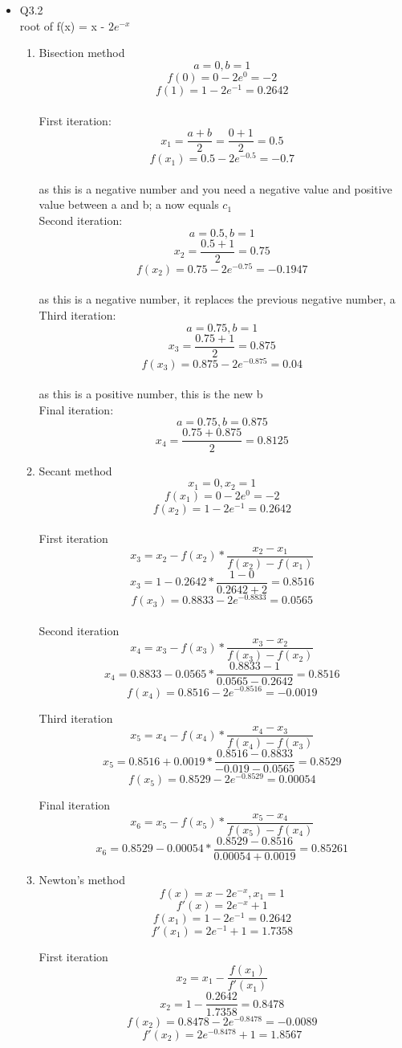 \documentclass{article}
\begin{document}
\begin{itemize}
\item Q3.2
  \\ root of f(x) = x - $2e^{-x}$
  \begin{enumerate}[label=(\alph*)]
  \item Bisection method
  \[ a=0, b=1\]
  \[f(0)=0-2e^0=-2\]
  \[f(1)=1-2e^{-1}=0.2642 \]
  \\First iteration:
  \[ x_1 = \frac{a+b}{2} = \frac{0+1}{2} = 0.5 \]
  \[f(x_1)=0.5 - 2e^{-0.5}=-0.7 \]
  \\ as this is a negative number and you need a negative value and positive value between a and b; a now equals $c_1$ 
  \\Second iteration:
  \[ a=0.5, b=1\]
  \[ x_2 = \frac{0.5+1}{2}=0.75 \]
  \[f(x_2)=0.75 - 2e^{-0.75}=-0.1947 \]
  \\ as this is a negative number, it replaces the previous negative number, a
  \\Third iteration:
  \[ a=0.75, b=1\]
  \[ x_3 = \frac{0.75+1}{2}=0.875 \]
  \[f(x_3)=0.875 - 2e^{-0.875}=0.04 \]
  \\ as this is a positive number, this is the new b
  \\Final iteration:
  \[ a=0.75, b=0.875\]
  \[ x_4 = \frac{0.75+0.875}{2}=0.8125 \]
  
  \item Secant method
  \[x_1 = 0, x_2=1 \]
  \[f(x_1)= 0-2e^0=-2 \]
  \[f(x_2)= 1-2e^{-1}=0.2642\]
  \\First iteration
  \[x_3 = x_2 - f(x_2) * \frac{x_2-x_1}{f(x_2)-f(x_1)}\]
  \[ x_3= 1-0.2642*\frac{1-0}{0.2642+2} =0.8516 \]
  \[f(x_3)= 0.8833-2e^{-0.8833}=0.0565 \]
  \\Second iteration
  \[x_4 = x_3 - f(x_3) * \frac{x_3-x_2}{f(x_3)-f(x_2)}\]
  \[x_4=0.8833-0.0565*\frac{0.8833-1}{0.0565-0.2642} =0.8516\]  
  \[f(x_4)= 0.8516-2e^{-0.8516}=-0.0019 \]
  
  Third iteration
  \[x_5 = x_4 - f(x_4) * \frac{x_4-x_3}{f(x_4)-f(x_3)}\]
  \[x_5=0.8516+0.0019*\frac{0.8516-0.8833}{-0.019-0.0565} =0.8529\]  
  \[f(x_5)= 0.8529-2e^{-0.8529}=0.00054 \]
  
  Final iteration
  \[x_6 = x_5 - f(x_5) * \frac{x_5-x_4}{f(x_5)-f(x_4)}\]
  \[x_6=0.8529-0.00054*\frac{0.8529-0.8516}{0.00054+0.0019} =0.85261\]  
    
  \item Newton's method
  \[ f(x) = x-2e^{-x}, x_1=1 \]
  \[ f'(x)=2e^{-x}+1\]
  \[ f(x_1)= 1-2e^{-1}=0.2642\]
  \[ f'(x_1)=2e^{-1}+1=1.7358\]
  
  First iteration
  \[ x_2=x_1 - \frac{f(x_1)}{f'(x_1)}\]
  \[ x_2=1 - \frac{0.2642}{1.7358}=0.8478\]
  \[ f(x_2)= 0.8478-2e^{-0.8478}=-0.0089\]
  \[ f'(x_2)=2e^{-0.8478}+1=1.8567\]
  

\end{enumerate}
\end{itemize}
\end{document}

